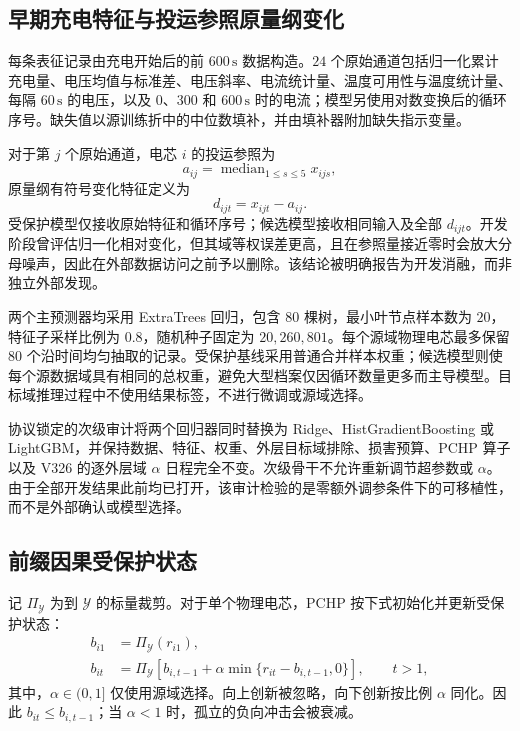 \documentclass[UTF8,11pt]{ctexart}
\begin{document}
\subsection{早期充电特征与投运参照原量纲变化}

每条表征记录由充电开始后的前 $600\,\mathrm{s}$ 数据构造。$24$ 个原始通道包括归一化累计充电量、电压均值与标准差、电压斜率、电流统计量、温度可用性与温度统计量、每隔 $60\,\mathrm{s}$ 的电压，以及 $0$、$300$ 和 $600\,\mathrm{s}$ 时的电流；模型另使用对数变换后的循环序号。缺失值以源训练折中的中位数填补，并由填补器附加缺失指示变量。

对于第 $j$ 个原始通道，电芯 $i$ 的投运参照为
\begin{equation}
  a_{ij}=\operatorname{median}_{1\leq s\leq5}x_{ijs},
\end{equation}
原量纲有符号变化特征定义为
\begin{equation}
  d_{ijt}=x_{ijt}-a_{ij}.
  \label{eq:change_zh}
\end{equation}
受保护模型仅接收原始特征和循环序号；候选模型接收相同输入及全部 $d_{ijt}$。开发阶段曾评估归一化相对变化，但其域等权误差更高，且在参照量接近零时会放大分母噪声，因此在外部数据访问之前予以删除。该结论被明确报告为开发消融，而非独立外部发现。

两个主预测器均采用 ExtraTrees 回归，包含 $80$ 棵树，最小叶节点样本数为 $20$，特征子采样比例为 $0.8$，随机种子固定为 $20{,}260{,}801$。每个源域物理电芯最多保留 $80$ 个沿时间均匀抽取的记录。受保护基线采用普通合并样本权重；候选模型则使每个源数据域具有相同的总权重，避免大型档案仅因循环数量更多而主导模型。目标域推理过程中不使用结果标签，不进行微调或源域选择。

协议锁定的次级审计将两个回归器同时替换为 Ridge、HistGradientBoosting 或 LightGBM，并保持数据、特征、权重、外层目标域排除、损害预算、PCHP 算子以及 V326 的逐外层域 $\alpha$ 日程完全不变。次级骨干不允许重新调节超参数或 $\alpha$。由于全部开发结果此前均已打开，该审计检验的是零额外调参条件下的可移植性，而不是外部确认或模型选择。

\subsection{前缀因果受保护状态}

记 $\Pi_{\mathcal Y}$ 为到 $\mathcal Y$ 的标量裁剪。对于单个物理电芯，PCHP 按下式初始化并更新受保护状态：
\begin{align}
  b_{i1}&=\Pi_{\mathcal Y}(r_{i1}),\\
  b_{it}&=\Pi_{\mathcal Y}\!\left[b_{i,t-1}
  +\alpha\min\{r_{it}-b_{i,t-1},0\}\right],\qquad t>1,
  \label{eq:causal_state_zh}
\end{align}
其中，$\alpha\in(0,1]$ 仅使用源域选择。向上创新被忽略，向下创新按比例 $\alpha$ 同化。因此 $b_{it}\leq b_{i,t-1}$；当 $\alpha<1$ 时，孤立的负向冲击会被衰减。
\end{document}
